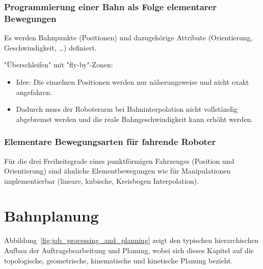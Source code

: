 \documentclass[a4paper, 11pt, accentcolor = tud3b]{tudreport}
\begin{document}
			\subsection{Programmierung einer Bahn als Folge elementarer Bewegungen}
				Es werden Bahnpunkte (Positionen) und dazugehörige Attribute (Orientierung, Geschwindigkeit, \dots) definiert.
				
				"Überschleifen" mit "fly-by"-Zonen:
				\begin{itemize}
					\item Idee: Die einzelnen Positionen werden nur näherungsweise und nicht exakt angefahren.
					\item Dadurch muss der Roboterarm bei Bahninterpolation nicht vollständig abgebremst werden und die reale Bahngeschwindigkeit kann erhöht werden.
				\end{itemize}

			\subsection{Elementare Bewegungsarten für fahrende Roboter}
				Für die drei Freiheitsgrade eines punktförmigen Fahrzeuges (Position und Orientierung) sind ähnliche Elementbewegungen wie für Manipulationen implementierbar (lineare, kubische, Kreisbogen Interpolation).

	\chapter{Bahnplanung}
		\label{c:bahnplanung}
	
		Abbildung~\ref{fig:job_processing_and_planning} zeigt den typischen hierarchischen Aufbau der Auftragsbearbeitung und Planung, wobei sich dieses Kapitel auf die topologische, geometrische, kinematische und kinetische Planung bezieht.
		
\end{document}
